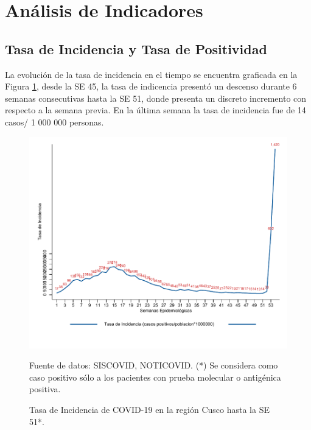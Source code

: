 \documentclass[12pt,a4paper,openany]{book}
\begin{document}

\clearpage

    \section*{Análisis de Indicadores}
   	\subsection*{Tasa de Incidencia y Tasa de Positividad}
\noindent La evolución de la tasa de incidencia en el tiempo se encuentra graficada en la Figura \ref{fig:incidencia}, desde la SE 45, la tasa de indicencia presentó un descenso durante 6 semanas consecutivas hasta la SE 51,  donde presenta un discreto incremento con respecto a la semana previa. En la última semana la tasa de incidencia fue de 14 casos/ 1 000 000 personas.  

   \begin{figure}[h]
   	\caption{Tasa de Incidencia de COVID-19 en la región Cusco hasta la SE 51*. }\label{fig:incidencia}
   	\begin{center}
   		\includegraphics[width=0.85\linewidth]{../figuras/tasa_incidencia.pdf}
   	\end{center}
   	{\footnotesize {Fuente de datos: SISCOVID, NOTICOVID. (*) Se considera como caso positivo sólo a los pacientes con prueba molecular o antigénica positiva.}}
   \end{figure}
   
\end{document}
